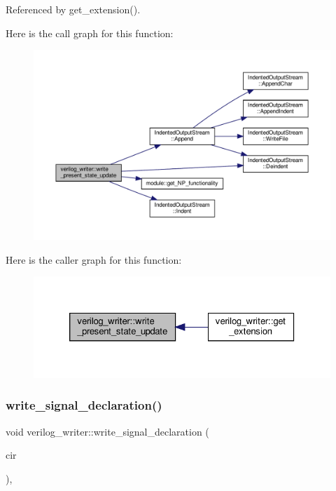 Referenced by get\+\_\+extension().

Here is the call graph for this function\+:
\nopagebreak
\begin{figure}[H]
\begin{center}
\leavevmode
\includegraphics[width=350pt]{d8/dba/classverilog__writer_ab1e052e8bfd33f42202ec7c834c80039_cgraph}
\end{center}
\end{figure}
Here is the caller graph for this function\+:
\nopagebreak
\begin{figure}[H]
\begin{center}
\leavevmode
\includegraphics[width=326pt]{d8/dba/classverilog__writer_ab1e052e8bfd33f42202ec7c834c80039_icgraph}
\end{center}
\end{figure}
\mbox{\label{classverilog__writer_ad10d67870682d947144dac0629560742}} 
\subsubsection{\texorpdfstring{write\+\_\+signal\+\_\+declaration()}{write\_signal\_declaration()}}
{\footnotesize\ttfamily void verilog\+\_\+writer\+::write\+\_\+signal\+\_\+declaration (\begin{DoxyParamCaption}\item[{const \hyperlink{structural__objects_8hpp_a8ea5f8cc50ab8f4c31e2751074ff60b2}{structural\+\_\+object\+Ref} \&}]{cir }\end{DoxyParamCaption})\hspace{0.3cm}{\ttfamily [override]}, {\ttfamily [virtual]}}



